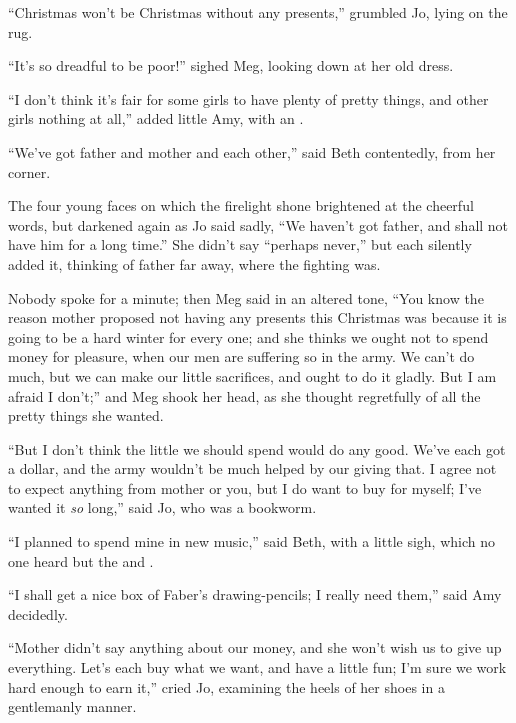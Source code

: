 \documentclass{fiche}
\begin{document}
\begin{texte}
``Christmas won't be Christmas without any presents,'' grumbled Jo, lying on the rug.

``It's so dreadful to be poor!'' sighed Meg, looking down at her old dress.

``I don't think it's fair for some girls to have plenty of pretty things, and other girls
nothing at all,'' added little Amy, with an .

``We've got father and mother and each other,'' said Beth contentedly, from her corner.

The four young faces on which the firelight shone brightened at the cheerful words, but
darkened again as Jo said sadly, ``We haven't got father, and shall not have him for a long
time.'' She didn't say ``perhaps never,'' but each silently added it, thinking of father far
away, where the fighting was.

Nobody spoke for a minute; then Meg said in an altered tone, ``You know the reason mother
proposed not having any presents this Christmas was because it is going to be a hard winter
for every one; and she thinks we ought not to spend money for pleasure, when our men are
suffering so in the army. We can't do much, but we can make our little sacrifices, and ought
to do it gladly. But I am afraid I don't;'' and Meg shook her head, as she thought
regretfully of all the pretty things she wanted.

``But I don't think the little we should spend would do any good. We've each got a dollar,
and the army wouldn't be much helped by our giving that. I agree not to expect anything from
mother or you, but I do want to buy  for myself; I've wanted it \emph{so}
long,'' said Jo, who was a bookworm.

``I planned to spend mine in new music,'' said Beth, with a little sigh, which no one heard
but the  and
.

``I shall get a nice box of Faber's drawing-pencils; I really need them,'' said Amy
decidedly.

``Mother didn't say anything about our money, and she won't wish us to give up everything.
Let's each buy what we want, and have a little fun; I'm sure we work hard enough to earn
it,'' cried Jo, examining the heels of her shoes in a gentlemanly manner.


\end{texte}
\end{document}
